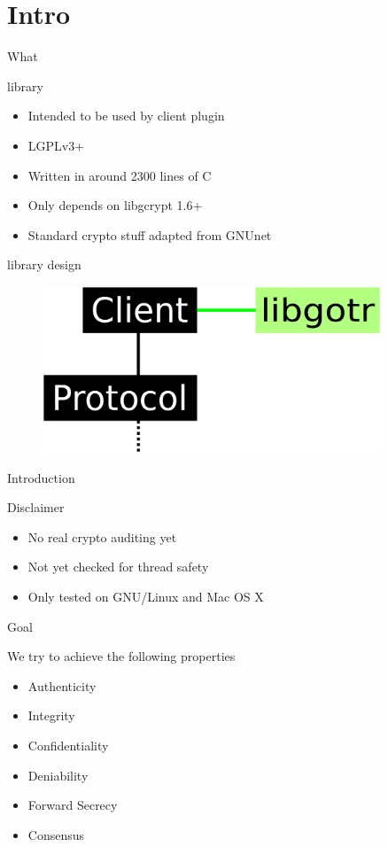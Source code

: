 \section{Intro}
\begin{frame}{What}
	\begin{block}{library}
		\begin{itemize}
			\item Intended to be used by client plugin
			\item LGPLv3+
			\item Written in around 2300 lines of C
			\item Only depends on libgcrypt 1.6+
			\item Standard crypto stuff adapted from GNUnet
		\end{itemize}
	\end{block}
\end{frame}

\begin{frame}{library design}
	\begin{figure}
		\centering
		\includegraphics[width = 0.9\textwidth]{./abbildungen/arch_client.eps}
	\end{figure}
\end{frame}

\begin{frame}{Introduction}
	\begin{alertblock}{Disclaimer}
		\begin{itemize}
			\item No real crypto auditing yet
			\item Not yet checked for thread safety
			\item Only tested on GNU/Linux and Mac OS X
		\end{itemize}
	\end{alertblock}
\end{frame}

\begin{frame}{Goal}
	\begin{block}{We try to achieve the following properties}
		\begin{itemize}
			\item Authenticity
			\item Integrity
			\item Confidentiality
			\item Deniability
			\item Forward Secrecy
			\item Consensus
		\end{itemize}
	\end{block}
\end{frame}

